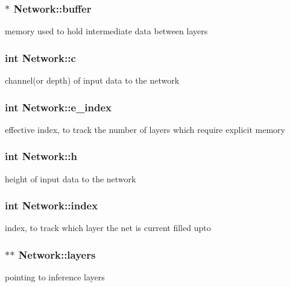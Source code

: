 \subsubsection[{buffer}]{$\ast$ Network\+::buffer}\hypertarget{structNetwork_a62d9738438f06b213ac9cc2fa05d2e41}{}\label{structNetwork_a62d9738438f06b213ac9cc2fa05d2e41}
memory used to hold intermediate data between layers 
\subsubsection[{c}]{\setlength{\rightskip}{0pt plus 5cm}int Network\+::c}\hypertarget{structNetwork_ab981932a6bab821f3e04aef9fe888051}{}\label{structNetwork_ab981932a6bab821f3e04aef9fe888051}
channel(or depth) of input data to the network 
\subsubsection[{e\+\_\+index}]{\setlength{\rightskip}{0pt plus 5cm}int Network\+::e\+\_\+index}\hypertarget{structNetwork_a52ba4784c1ac8dba38c98987edb94fd0}{}\label{structNetwork_a52ba4784c1ac8dba38c98987edb94fd0}
effective index, to track the number of layers which require explicit memory 
\subsubsection[{h}]{\setlength{\rightskip}{0pt plus 5cm}int Network\+::h}\hypertarget{structNetwork_a9a89cd9f1a81ccc8e1ca1b748cb6322f}{}\label{structNetwork_a9a89cd9f1a81ccc8e1ca1b748cb6322f}
height of input data to the network 
\subsubsection[{index}]{\setlength{\rightskip}{0pt plus 5cm}int Network\+::index}\hypertarget{structNetwork_a1b4ffc833bb85932b56477680948f24a}{}\label{structNetwork_a1b4ffc833bb85932b56477680948f24a}
index, to track which layer the net is current filled upto 
\subsubsection[{layers}]{$\ast$$\ast$ Network\+::layers}\hypertarget{structNetwork_a409fd1196f91871f40465bc914c8469d}{}\label{structNetwork_a409fd1196f91871f40465bc914c8469d}
pointing to inference layers 
